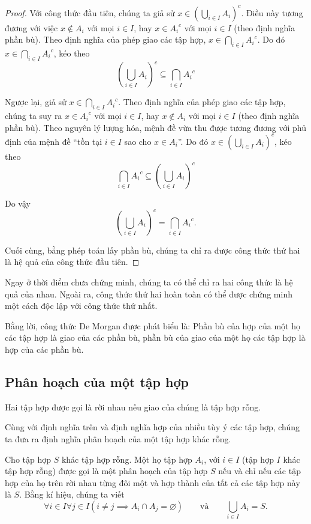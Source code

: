\begin{proof}
    Với công thức đầu tiên, chúng ta giả sử $x \in {\left(\bigcup_{i\in I}A_{i}\right)}^{c}$. Điều này tương đương với việc $x\notin A_{i}$ với mọi $i\in I$, hay $x\in {A_{i}}^{c}$ với mọi $i\in I$ (theo định nghĩa phần bù). Theo định nghĩa của phép giao các tập hợp, $x\in \bigcap_{i\in I}{A_{i}}^{c}$. Do đó $x\in \bigcap_{i\in I}{A_{i}}^{c}$, kéo theo
    \[
        {\left(\bigcup_{i\in I}A_{i}\right)}^{c} \subseteq \bigcap_{i\in I}{A_{i}}^{c}
    \]

    Ngược lại, giả sử $x\in \bigcap_{i\in I}{A_{i}}^{c}$. Theo định nghĩa của phép giao các tập hợp, chúng ta suy ra $x\in {A_{i}}^{c}$ với mọi $i\in I$, hay $x\notin A_{i}$ với mọi $i\in I$ (theo định nghĩa phần bù). Theo nguyên lý lượng hóa, mệnh đề vừa thu được tương đương với phủ định của mệnh đề ``tồn tại $i\in I$ sao cho $x\in A_{i}$''. Do đó $x\in {\left(\bigcup_{i\in I}A_{i}\right)}^{c}$, kéo theo
    \[
        \bigcap_{i\in I}{A_{i}}^{c} \subseteq {\left(\bigcup_{i\in I}A_{i}\right)}^{c}
    \]

    Do vậy
    \[
        {\left(\bigcup_{i\in I}A_{i}\right)}^{c} = \bigcap_{i\in I}{A_{i}}^{c}.
    \]

    Cuối cùng, bằng phép toán lấy phần bù, chúng ta chỉ ra được công thức thứ hai là hệ quả của công thức đầu tiên.
\end{proof}

Ngay ở thời điểm chưa chứng minh, chúng ta có thể chỉ ra hai công thức là hệ quả của nhau. Ngoài ra, công thức thứ hai hoàn toàn có thể được chứng minh một cách độc lập với công thức thứ nhất.

Bằng lời, công thức De Morgan được phát biểu là: Phần bù của hợp của một họ các tập hợp là giao của các phần bù, phần bù của giao của một họ các tập hợp là hợp của các phần bù.

\subsection*{Phân hoạch của một tập hợp}

\begin{definition}
    Hai tập hợp được gọi là rời nhau nếu giao của chúng là tập hợp rỗng.
\end{definition}

Cùng với định nghĩa trên và định nghĩa hợp của nhiều tùy ý các tập hợp, chúng ta đưa ra định nghĩa phân hoạch của một tập hợp khác rỗng.

\begin{definition}
    Cho tập hợp $S$ khác tập hợp rỗng. Một họ tập hợp $A_{i}$, với $i\in I$ (tập hợp $I$ khác tập hợp rỗng) được gọi là một phân hoạch của tập hợp $S$ nếu và chỉ nếu các tập hợp của họ trên rời nhau từng đôi một và hợp thành của tất cả các tập hợp này là $S$. Bằng kí hiệu, chúng ta viết
    \[
        \forall i\in I\forall j\in I (i\ne j \implies A_{i}\cap A_{j} = \varnothing) \qquad\text{và}\qquad\bigcup_{i\in I}A_{i} = S.
    \]
\end{definition}

